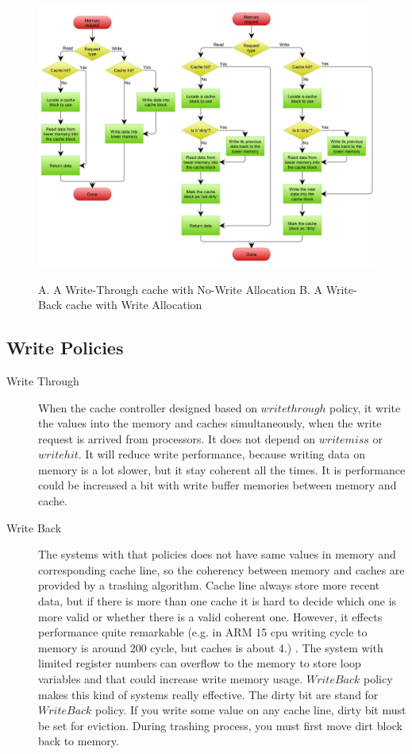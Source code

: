     \begin{figure}[h!]
        \centering
        \includegraphics[width=1\textwidth]{img/policies.jpg}
        \caption{A. A Write-Through cache with No-Write Allocation B. A Write-Back cache with Write Allocation}
        \cite{wikipolicies}
        \label{fig:cachepolicies}
    \end{figure}

    \subsection*{Write Policies }
    \begin{description}
        \item[Write Through] When the cache controller designed based on $write through$ policy, it write the values into the memory and caches simultaneously, when the write request is arrived from processors. It does not depend on $write miss$ or $write hit$. It will reduce write performance, because writing data on memory is a lot slower, but it stay coherent all the times. It is performance could be increased a bit  with write buffer memories between memory and cache.
        \item[Write Back] The systems with that policies does not have same values in memory and corresponding cache line, so the coherency between memory and caches are provided by a trashing algorithm. Cache line always store more recent data, but if there is more than one cache it is hard to decide which one is more valid or whether there is a valid coherent one.  However, it effects performance quite remarkable (e.g. in ARM 15 cpu writing cycle to memory is around 200 cycle, but caches is about 4.) . The system with limited register numbers can overflow to the memory to store loop variables and that could increase write memory usage. $Write Back$ policy makes this kind of systems really effective. The dirty bit are stand for $WriteBack$ policy. If you write some value on any cache line, dirty bit must be set for eviction. During trashing process, you must first move dirt block back to memory. 
    \end{description}
